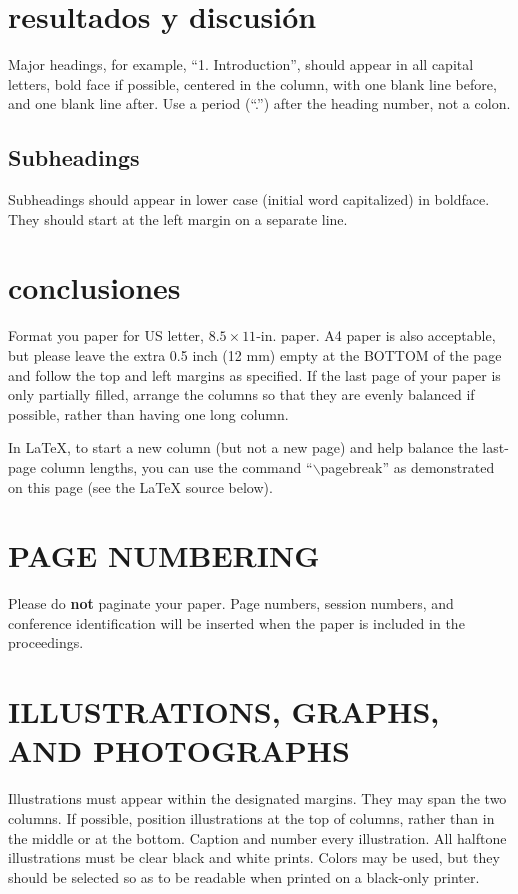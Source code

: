 \documentclass[spanish]{article}
\begin{document}
\section{resultados y discusión}
\label{sec:majhead}

Major headings, for example, ``1. Introduction'', should appear in all capital
letters, bold face if possible, centered in the column, with one blank line
before, and one blank line after. Use a period (``.'') after the heading number,
not a colon.

\subsection{Subheadings}
\label{ssec:subhead}

Subheadings should appear in lower case (initial word capitalized) in
boldface. They should start at the left margin on a separate line.
 

\section{conclusiones}
\label{sec:print}

Format you paper for US letter, $8.5 \times 11$-in. paper.
A4 paper is also acceptable, but please leave the extra 0.5 inch (12 mm)
empty at the BOTTOM of the page and follow the top and left margins as
specified. If the last page of your paper is only partially filled, arrange
the columns so that they are evenly balanced if possible, rather than having
one long column.

In LaTeX, to start a new column (but not a new page) and help balance the
last-page column lengths, you can use the command ``$\backslash$pagebreak'' as
demonstrated on this page (see the LaTeX source below).

\section{PAGE NUMBERING}
\label{sec:page}

Please do {\bf not} paginate your paper. Page numbers, session numbers, and
conference identification will be inserted when the paper is included in the
proceedings.

\section{ILLUSTRATIONS, GRAPHS, AND PHOTOGRAPHS}
\label{sec:illust}

Illustrations must appear within the designated margins. They may span the two
columns. If possible, position illustrations at the top of columns, rather
than in the middle or at the bottom.  Caption and number every illustration.
All halftone illustrations must be clear black and white prints. Colors may be
used, but they should be selected so as to be readable when printed on a
black-only printer.
\end{document}
